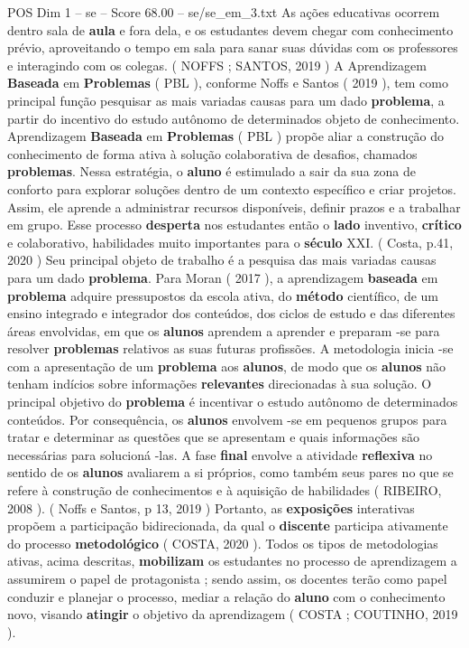 \begin{textsample}{POS Dim 1 – se – Score 68.00 – se/se\_em\_3.txt}
As ações educativas ocorrem dentro sala de \textbf{aula} e fora dela, e os estudantes devem chegar com conhecimento prévio, aproveitando o tempo em sala para sanar suas dúvidas com os professores e interagindo com os colegas. ( NOFFS ; SANTOS, 2019 ) A Aprendizagem \textbf{Baseada} em \textbf{Problemas} ( PBL ), conforme Noffs e Santos ( 2019 ), tem como principal função pesquisar as mais variadas causas para um dado \textbf{problema}, a partir do incentivo do estudo autônomo de determinados objeto de conhecimento.
Aprendizagem \textbf{Baseada} em \textbf{Problemas} ( PBL ) propõe aliar a construção do conhecimento de forma ativa à solução colaborativa de desafios, chamados \textbf{problemas}.
Nessa estratégia, o \textbf{aluno} é estimulado a sair da sua zona de conforto para explorar soluções dentro de um contexto específico e criar projetos.
Assim, ele aprende a administrar recursos disponíveis, definir prazos e a trabalhar em grupo.
Esse processo \textbf{desperta} nos estudantes então o \textbf{lado} inventivo, \textbf{crítico} e colaborativo, habilidades muito importantes para o \textbf{século} XXI. ( Costa, p.41, 2020 ) Seu principal objeto de trabalho é a pesquisa das mais variadas causas para um dado \textbf{problema}.
Para Moran ( 2017 ), a aprendizagem \textbf{baseada} em \textbf{problema} adquire pressupostos da escola ativa, do \textbf{método} científico, de um ensino integrado e integrador dos conteúdos, dos ciclos de estudo e das diferentes áreas envolvidas, em que os \textbf{alunos} aprendem a aprender e preparam -se para resolver \textbf{problemas} relativos as suas futuras profissões.
A metodologia inicia -se com a apresentação de um \textbf{problema} aos \textbf{alunos}, de modo que os \textbf{alunos} não tenham indícios sobre informações \textbf{relevantes} direcionadas à sua solução.
O principal objetivo do \textbf{problema} é incentivar o estudo autônomo de determinados conteúdos.
Por consequência, os \textbf{alunos} envolvem -se em pequenos grupos para tratar e determinar as questões que se apresentam e quais informações são necessárias para solucioná -las.
A fase \textbf{final} envolve a atividade \textbf{reflexiva} no sentido de os \textbf{alunos} avaliarem a si próprios, como também seus pares no que se refere à construção de conhecimentos e à aquisição de habilidades ( RIBEIRO, 2008 ). ( Noffs e Santos, p 13, 2019 ) Portanto, as \textbf{exposições} interativas propõem a participação bidirecionada, da qual o \textbf{discente} participa ativamente do processo \textbf{metodológico} ( COSTA, 2020 ).
Todos os tipos de metodologias ativas, acima descritas, \textbf{mobilizam} os estudantes no processo de aprendizagem a assumirem o papel de protagonista ; sendo assim, os docentes terão como papel conduzir e planejar o processo, mediar a relação do \textbf{aluno} com o conhecimento novo, visando \textbf{atingir} o objetivo da aprendizagem ( COSTA ; COUTINHO, 2019 ).

\end{textsample}
